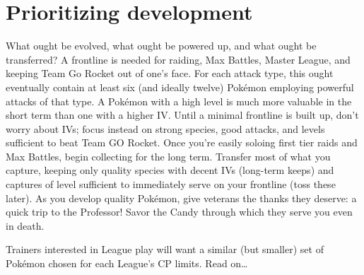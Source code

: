\section{Prioritizing development\label{sec:developmentpriority}}
What ought be evolved, what ought be powered up, and what ought be transferred?
A frontline is needed for raiding, Max Battles, Master League, and keeping Team Go Rocket out of one's face.
For each attack type, this ought eventually contain at least six (and ideally twelve) Pokémon
  employing powerful attacks of that type.
A Pokémon with a high level is much more valuable in the short term than one with a higher IV.
Until a minimal frontline is built up, don't worry about IVs; focus instead on strong species,
  good attacks, and levels sufficient to beat Team GO Rocket.
Once you're easily soloing first tier raids and Max Battles, begin collecting for the long term.
Transfer most of what you capture, keeping only quality species with decent IVs (long-term keeps)
  and captures of level sufficient to immediately serve on your frontline (toss these later).
As you develop quality Pokémon, give veterans the thanks they deserve: a quick trip to the Professor!
Savor the Candy through which they serve you even in death.

Trainers interested in League play will want a similar (but smaller) set of Pokémon chosen for each League's CP limits.
Read on\ldots
